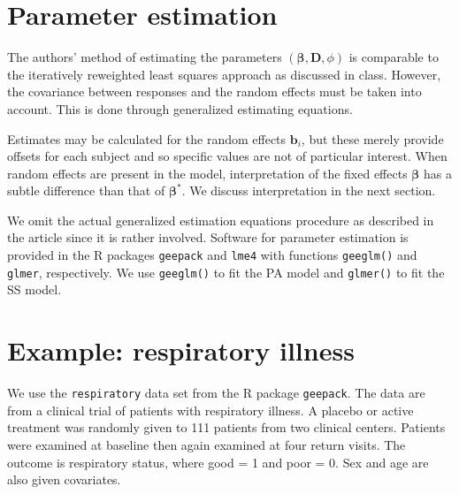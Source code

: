 \documentclass[12pt]{article}
\newcommand{\m}[1]{\mathbf{\bm{#1}}}
\begin{document}
\section*{Parameter estimation}

\noindent The authors' method of estimating the parameters $(\m{\beta},\m{D},\phi)$ is comparable to the iteratively reweighted least squares approach as discussed in class. However, the covariance between responses and the random effects must be taken into account. This is done through generalized estimating equations.
\bigskip

\noindent Estimates may be calculated for the random effects $\m{b}_i$, but these merely provide offsets for each subject and so specific values are not of particular interest. When random effects are present in the model, interpretation of the fixed effects $\m{\beta}$ has a subtle difference than that of $\m{\beta}^*$. We discuss interpretation in the next section.
\bigskip

\noindent We omit the actual generalized estimation equations procedure as described in the article since it is rather involved. Software for parameter estimation is provided in the R packages \texttt{geepack}  and \texttt{lme4} with functions \texttt{geeglm()} and \texttt{glmer}, respectively. We use \texttt{geeglm()} to fit the PA model and \texttt{glmer()} to fit the SS model.

\section*{Example: respiratory illness}

\noindent We use the \texttt{respiratory} data set from the R package \texttt{geepack}. The data are from a clinical trial of patients with respiratory illness. A placebo or active treatment was randomly given to 111 patients from two clinical centers. Patients were examined at baseline then again examined at four return visits. The outcome is respiratory status, where good = 1 and poor = 0. Sex and age are also given covariates.
\bigskip
\end{document}
